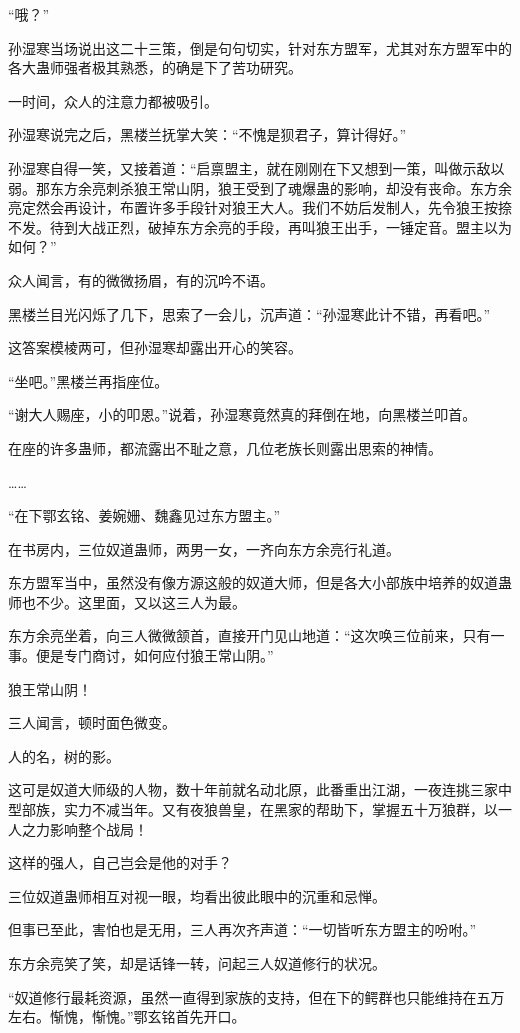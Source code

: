 \begin{this_body}
“哦？”

孙湿寒当场说出这二十三策，倒是句句切实，针对东方盟军，尤其对东方盟军中的各大蛊师强者极其熟悉，的确是下了苦功研究。

一时间，众人的注意力都被吸引。

孙湿寒说完之后，黑楼兰抚掌大笑：“不愧是狈君子，算计得好。”

孙湿寒自得一笑，又接着道：“启禀盟主，就在刚刚在下又想到一策，叫做示敌以弱。那东方余亮刺杀狼王常山阴，狼王受到了魂爆蛊的影响，却没有丧命。东方余亮定然会再设计，布置许多手段针对狼王大人。我们不妨后发制人，先令狼王按捺不发。待到大战正烈，破掉东方余亮的手段，再叫狼王出手，一锤定音。盟主以为如何？”

众人闻言，有的微微扬眉，有的沉吟不语。

黑楼兰目光闪烁了几下，思索了一会儿，沉声道：“孙湿寒此计不错，再看吧。”

这答案模棱两可，但孙湿寒却露出开心的笑容。

“坐吧。”黑楼兰再指座位。

“谢大人赐座，小的叩恩。”说着，孙湿寒竟然真的拜倒在地，向黑楼兰叩首。

在座的许多蛊师，都流露出不耻之意，几位老族长则露出思索的神情。

……

“在下鄂玄铭、姜婉姗、魏鑫见过东方盟主。”

在书房内，三位奴道蛊师，两男一女，一齐向东方余亮行礼道。

东方盟军当中，虽然没有像方源这般的奴道大师，但是各大小部族中培养的奴道蛊师也不少。这里面，又以这三人为最。

东方余亮坐着，向三人微微颔首，直接开门见山地道：“这次唤三位前来，只有一事。便是专门商讨，如何应付狼王常山阴。”

狼王常山阴！

三人闻言，顿时面色微变。

人的名，树的影。

这可是奴道大师级的人物，数十年前就名动北原，此番重出江湖，一夜连挑三家中型部族，实力不减当年。又有夜狼兽皇，在黑家的帮助下，掌握五十万狼群，以一人之力影响整个战局！

这样的强人，自己岂会是他的对手？

三位奴道蛊师相互对视一眼，均看出彼此眼中的沉重和忌惮。

但事已至此，害怕也是无用，三人再次齐声道：“一切皆听东方盟主的吩咐。”

东方余亮笑了笑，却是话锋一转，问起三人奴道修行的状况。

“奴道修行最耗资源，虽然一直得到家族的支持，但在下的鳄群也只能维持在五万左右。惭愧，惭愧。”鄂玄铭首先开口。


\end{this_body}
